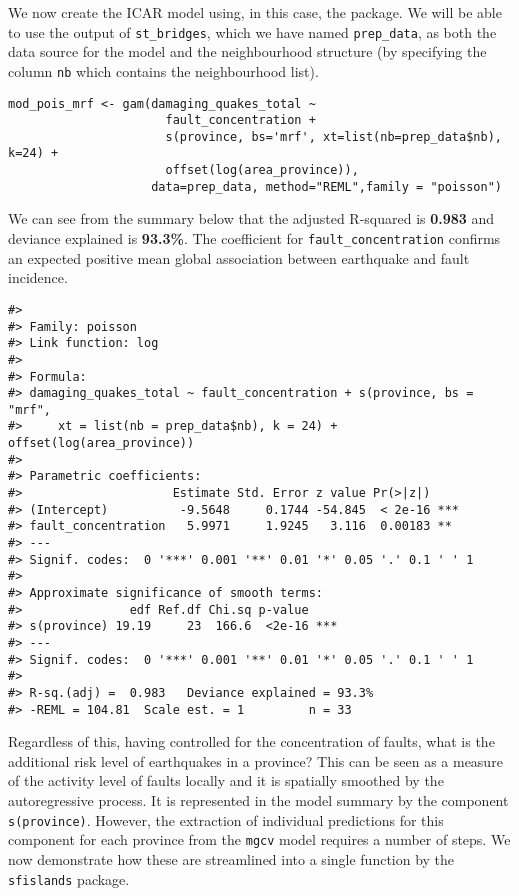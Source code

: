 We now create the ICAR model using, in this case, the  package. We will be able to use the output of \texttt{st\_bridges}, which we have named \texttt{prep\_data}, as both the data source for the model and the neighbourhood structure (by specifying the column \texttt{nb} which contains the neighbourhood list).

\begin{verbatim}
mod_pois_mrf <- gam(damaging_quakes_total ~ 
                      fault_concentration +
                      s(province, bs='mrf', xt=list(nb=prep_data$nb), k=24) +
                      offset(log(area_province)),
                    data=prep_data, method="REML",family = "poisson")
\end{verbatim}

We can see from the summary below that the adjusted R-squared is \textbf{0.983} and deviance explained is \textbf{93.3\%}. The coefficient for \texttt{fault\_concentration} confirms an expected positive mean global association between earthquake and fault incidence.

\begin{verbatim}
#> 
#> Family: poisson 
#> Link function: log 
#> 
#> Formula:
#> damaging_quakes_total ~ fault_concentration + s(province, bs = "mrf", 
#>     xt = list(nb = prep_data$nb), k = 24) + offset(log(area_province))
#> 
#> Parametric coefficients:
#>                     Estimate Std. Error z value Pr(>|z|)    
#> (Intercept)          -9.5648     0.1744 -54.845  < 2e-16 ***
#> fault_concentration   5.9971     1.9245   3.116  0.00183 ** 
#> ---
#> Signif. codes:  0 '***' 0.001 '**' 0.01 '*' 0.05 '.' 0.1 ' ' 1
#> 
#> Approximate significance of smooth terms:
#>               edf Ref.df Chi.sq p-value    
#> s(province) 19.19     23  166.6  <2e-16 ***
#> ---
#> Signif. codes:  0 '***' 0.001 '**' 0.01 '*' 0.05 '.' 0.1 ' ' 1
#> 
#> R-sq.(adj) =  0.983   Deviance explained = 93.3%
#> -REML = 104.81  Scale est. = 1         n = 33
\end{verbatim}

Regardless of this, having controlled for the concentration of faults, what is the additional risk level of earthquakes in a province? This can be seen as a measure of the activity level of faults locally and it is spatially smoothed by the autoregressive process. It is represented in the model summary by the component \texttt{s(province)}. However, the extraction of individual predictions for this component for each province from the \texttt{mgcv} model requires a number of steps. We now demonstrate how these are streamlined into a single function by the \texttt{sfislands} package.

